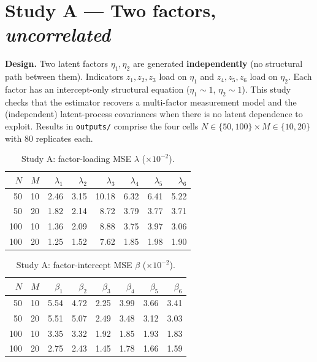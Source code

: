 \documentclass[11pt]{article}
\begin{document}
\section*{Study A --- Two factors, \emph{uncorrelated}}

\textbf{Design.} Two latent factors $\eta_1,\eta_2$ are generated
\textbf{independently} (no structural path between them). Indicators
$z_1,z_2,z_3$ load on $\eta_1$ and $z_4,z_5,z_6$ load on $\eta_2$. Each factor has
an intercept-only structural equation ($\eta_1\sim 1$, $\eta_2\sim 1$). This study
checks that the estimator recovers a multi-factor measurement model and the
(independent) latent-process covariances when there is no latent dependence to
exploit. Results in \texttt{outputs/} comprise the four cells
$N\in\{50,100\}\times M\in\{10,20\}$ with 80 replicates each.

\begin{table}[ht]
\centering
\caption{Study A: factor-loading MSE $\lambda$ ($\times 10^{-2}$).}
\begin{tabular}{rrrrrrrr}
\toprule
$N$ & $M$ & $\lambda_1$ & $\lambda_2$ & $\lambda_3$ & $\lambda_4$ & $\lambda_5$ & $\lambda_6$ \\
\midrule
50  & 10 & 2.46 & 3.15 & 10.18 & 6.32 & 6.41 & 5.22 \\
50  & 20 & 1.82 & 2.14 &  8.72 & 3.79 & 3.77 & 3.71 \\
100 & 10 & 1.36 & 2.09 &  8.88 & 3.75 & 3.97 & 3.06 \\
100 & 20 & 1.25 & 1.52 &  7.62 & 1.85 & 1.98 & 1.90 \\
\bottomrule
\end{tabular}
\end{table}

\begin{table}[ht]
\centering
\caption{Study A: factor-intercept MSE $\beta$ ($\times 10^{-2}$).}
\begin{tabular}{rrrrrrrr}
\toprule
$N$ & $M$ & $\beta_1$ & $\beta_2$ & $\beta_3$ & $\beta_4$ & $\beta_5$ & $\beta_6$ \\
\midrule
50  & 10 & 5.54 & 4.72 & 2.25 & 3.99 & 3.66 & 3.41 \\
50  & 20 & 5.51 & 5.07 & 2.49 & 3.48 & 3.12 & 3.03 \\
100 & 10 & 3.35 & 3.32 & 1.92 & 1.85 & 1.93 & 1.83 \\
100 & 20 & 2.75 & 2.43 & 1.45 & 1.78 & 1.66 & 1.59 \\
\bottomrule
\end{tabular}
\end{table}
\end{document}
